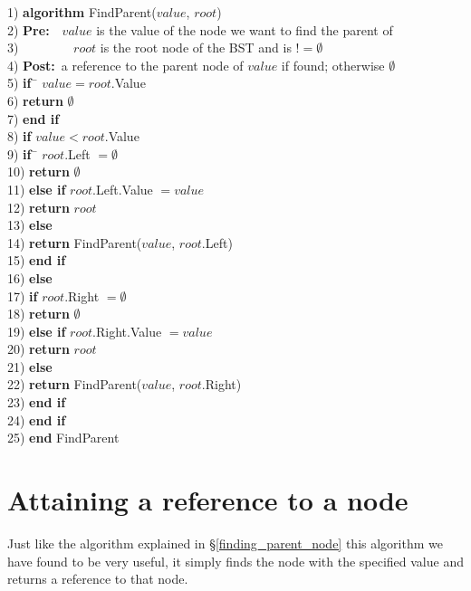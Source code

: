 \begin{tabbing}
1)  \textbf{alg}\= \textbf{orithm} FindParent($value$, $root$) \\
2)  \> \textbf{Pre:}~~$value$ is the value of the node we want to find the parent of \\
3)  \> ~~~~~~~~$root$ is the root node of the BST and is $!= \emptyset$ \\
4)  \> \textbf{Post:}~a reference to the parent node of $value$ if found; otherwise $\emptyset$ \\
5)  \> \textbf{if}~\= $value = root$.Value \\
6)  \> \> \textbf{return} $\emptyset$ \\
7)  \> \textbf{end if} \\
8)  \> \textbf{if} $value < root$.Value \\
9)  \> \> \textbf{if}~\= $root$.Left $= \emptyset$ \\
10) \> \> \> \textbf{return} $\emptyset$ \\
11) \> \> \textbf{else if} $root$.Left.Value $= value$ \\
12) \> \> \> \textbf{return} $root$ \\
13) \> \> \textbf{else} \\
14) \> \> \> \textbf{return} FindParent($value$, $root$.Left) \\
15) \> \> \textbf{end if} \\
16) \> \textbf{else} \\
17) \> \> \textbf{if} $root$.Right $= \emptyset$ \\
18) \> \> \> \textbf{return} $\emptyset$ \\
19) \> \> \textbf{else if} $root$.Right.Value $= value$ \\
20) \> \> \> \textbf{return} $root$ \\
21) \> \> \textbf{else} \\
22) \> \> \> \textbf{return} FindParent($value$, $root$.Right) \\
23) \> \> \textbf{end if} \\
24) \> \textbf{end if} \\
25) \textbf{end} FindParent \\
\end{tabbing}

\section{Attaining a reference to a node} \label{find_node_reference}
Just like the algorithm explained in \S\ref{finding_parent_node} this algorithm we have found to be very useful, it simply finds the node with the specified value and returns a reference to that node.

